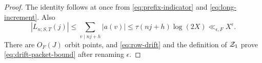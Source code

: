 \begin{proof}
The identity follows at once from
\eqref{eq:prefix-indicator} and \eqref{eq:long-increment}.  Also
\[
 |L_{n;S,T}(j)|
 \le \sum_{v\mid nj+h}|a(v)|
 \le \tau(nj+h)\log(2X)\ll_{\epsilon,F}X^\epsilon.
\]
There are \(O_F(J)\) orbit points, and
\eqref{eq:row-drift} and the definition of \(\mathcal Z_1\) prove
\eqref{eq:drift-packet-bound} after renaming \(\epsilon\).
\end{proof}
